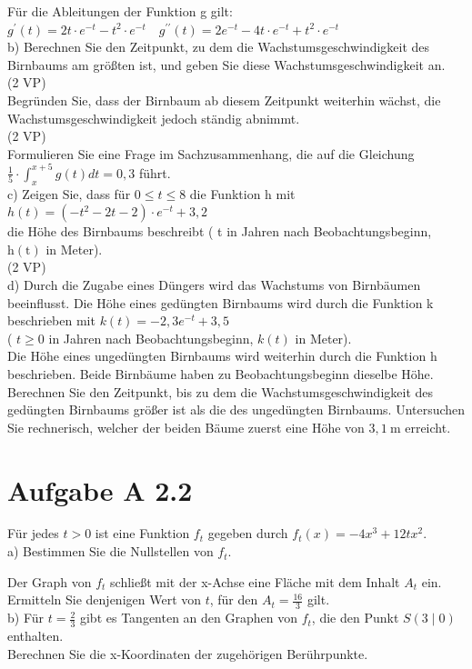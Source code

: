 \documentclass[10pt]{article}
\begin{document}
Für die Ableitungen der Funktion g gilt:\\
$g^{\prime}(t)=2 t \cdot e^{-t}-t^{2} \cdot e^{-t} \quad g^{\prime \prime}(t)=2 e^{-t}-4 t \cdot e^{-t}+t^{2} \cdot e^{-t}$\\
b) Berechnen Sie den Zeitpunkt, zu dem die Wachstumsgeschwindigkeit des Birnbaums am größten ist, und geben Sie diese Wachstumsgeschwindigkeit an.\\
(2 VP)\\
Begründen Sie, dass der Birnbaum ab diesem Zeitpunkt weiterhin wächst, die Wachstumsgeschwindigkeit jedoch ständig abnimmt.\\
(2 VP)\\
Formulieren Sie eine Frage im Sachzusammenhang, die auf die Gleichung\\
$\frac{1}{5} \cdot \int_{x}^{x+5} g(t) d t=0,3$ führt.\\
c) Zeigen Sie, dass für $0 \leq t \leq 8$ die Funktion h mit\\
$h(t)=\left(-t^{2}-2 t-2\right) \cdot e^{-t}+3,2$\\
die Höhe des Birnbaums beschreibt ( t in Jahren nach Beobachtungsbeginn, $\mathrm{h}(\mathrm{t})$ in Meter).\\
(2 VP)\\
d) Durch die Zugabe eines Düngers wird das Wachstums von Birnbäumen beeinflusst. Die Höhe eines gedüngten Birnbaums wird durch die Funktion k beschrieben mit $k(t)=-2,3 e^{-t}+3,5$\\
( $t \geq 0$ in Jahren nach Beobachtungsbeginn, $k(t)$ in Meter).\\
Die Höhe eines ungedüngten Birnbaums wird weiterhin durch die Funktion h beschrieben. Beide Birnbäume haben zu Beobachtungsbeginn dieselbe Höhe. Berechnen Sie den Zeitpunkt, bis zu dem die Wachstumsgeschwindigkeit des gedüngten Birnbaums größer ist als die des ungedüngten Birnbaums. Untersuchen Sie rechnerisch, welcher der beiden Bäume zuerst eine Höhe von $3,1 \mathrm{~m}$ erreicht.

\section*{Aufgabe A 2.2}
Für jedes $t>0$ ist eine Funktion $f_{t}$ gegeben durch $f_{t}(x)=-4 x^{3}+12 t x^{2}$.\\
a) Bestimmen Sie die Nullstellen von $f_{t}$.

Der Graph von $f_{t}$ schließt mit der x-Achse eine Fläche mit dem Inhalt $A_{t}$ ein. Ermitteln Sie denjenigen Wert von $t$, für den $A_{t}=\frac{16}{3}$ gilt.\\
b) Für $t=\frac{2}{3}$ gibt es Tangenten an den Graphen von $f_{t}$, die den Punkt $S(3 \mid 0)$ enthalten.\\
Berechnen Sie die x-Koordinaten der zugehörigen Berührpunkte.
\end{document}

